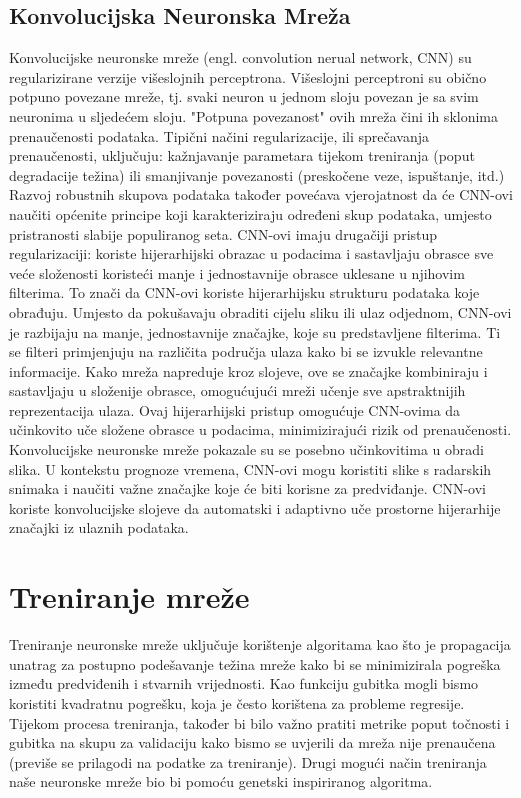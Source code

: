 \documentclass[times, utf8, zavrsni]{fer}
\begin{document}
\subsection{Konvolucijska Neuronska Mreža}
Konvolucijske neuronske mreže (engl. convolution nerual network, CNN) su regularizirane verzije višeslojnih perceptrona. Višeslojni perceptroni su obično potpuno povezane mreže, tj. svaki neuron u jednom sloju povezan je sa svim neuronima u sljedećem sloju. "Potpuna povezanost" ovih mreža čini ih sklonima prenaučenosti podataka. Tipični načini regularizacije, ili sprečavanja prenaučenosti, uključuju: kažnjavanje parametara tijekom treniranja (poput degradacije težina) ili smanjivanje povezanosti (preskočene veze, ispuštanje, itd.) Razvoj robustnih skupova podataka također povećava vjerojatnost da će CNN-ovi naučiti općenite principe koji karakteriziraju određeni skup podataka, umjesto pristranosti slabije populiranog seta. CNN-ovi imaju drugačiji pristup regularizaciji: koriste hijerarhijski obrazac u podacima i sastavljaju obrasce sve veće složenosti koristeći manje i jednostavnije obrasce uklesane u njihovim filterima. To znači da CNN-ovi koriste hijerarhijsku strukturu podataka koje obrađuju. Umjesto da pokušavaju obraditi cijelu sliku ili ulaz odjednom, CNN-ovi je razbijaju na manje, jednostavnije značajke, koje su predstavljene filterima. Ti se filteri primjenjuju na različita područja ulaza kako bi se izvukle relevantne informacije. Kako mreža napreduje kroz slojeve, ove se značajke kombiniraju i sastavljaju u složenije obrasce, omogućujući mreži učenje sve apstraktnijih reprezentacija ulaza. Ovaj hijerarhijski pristup omogućuje CNN-ovima da učinkovito uče složene obrasce u podacima, minimizirajući rizik od prenaučenosti. Konvolucijske neuronske mreže pokazale su se posebno učinkovitima u obradi slika. U kontekstu prognoze vremena, CNN-ovi mogu koristiti slike s radarskih snimaka i naučiti važne značajke koje će biti korisne za predviđanje. CNN-ovi koriste konvolucijske slojeve da automatski i adaptivno uče prostorne hijerarhije značajki iz ulaznih podataka.

\section{Treniranje mreže}
Treniranje neuronske mreže uključuje korištenje algoritama kao što je propagacija unatrag za postupno podešavanje težina mreže kako bi se minimizirala pogreška između predviđenih i stvarnih vrijednosti. Kao funkciju gubitka mogli bismo koristiti kvadratnu pogrešku, koja je često korištena za probleme regresije. Tijekom procesa treniranja, također bi bilo važno pratiti metrike poput točnosti i gubitka na skupu za validaciju kako bismo se uvjerili da mreža nije prenaučena (previše se prilagodi na podatke za treniranje). Drugi mogući način treniranja naše neuronske mreže bio bi pomoću genetski inspiriranog algoritma.
\end{document}
